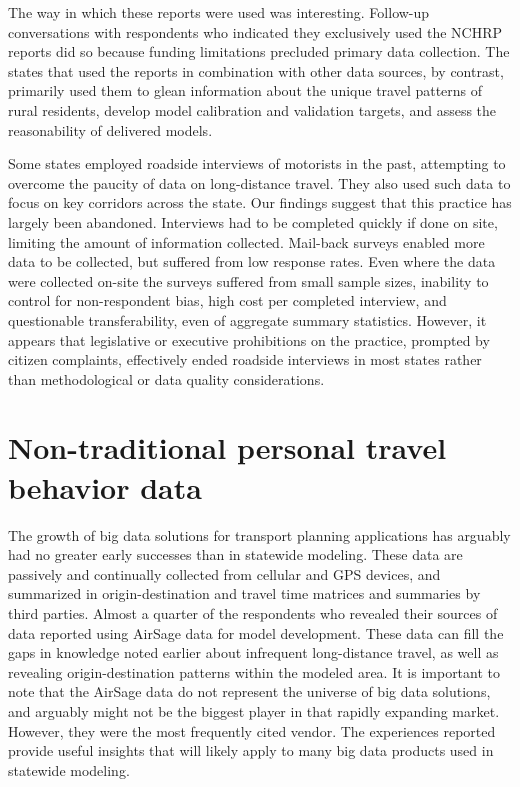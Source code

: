 The way in which these reports were used was interesting. Follow-up conversations with respondents who indicated they exclusively used the NCHRP reports did so because funding limitations precluded primary data collection. The states that used the reports in combination with other data sources, by contrast, primarily used them to glean information about the unique travel patterns of rural residents, develop model calibration and validation targets, and assess the reasonability of delivered models.

Some states employed roadside interviews of motorists in the past, attempting to overcome the paucity of data on long-distance travel. They also used such data to focus on key corridors across the state. Our findings suggest that this practice has largely been abandoned. Interviews had to be completed quickly if done on site, limiting the amount of information collected. Mail-back surveys enabled more data to be collected, but suffered from low response rates. Even where the data were collected on-site the surveys suffered from small sample sizes, inability to control for non-respondent bias, high cost per completed interview, and questionable transferability, even of aggregate summary statistics. However, it appears that legislative or executive prohibitions on the practice, prompted by citizen complaints, effectively ended roadside interviews in most states rather than methodological or data quality considerations.

\section{Non-traditional personal travel behavior data}\label{sec:nontraditional-person}

The growth of big data solutions for transport planning applications has arguably had no greater early successes than in statewide modeling. These data are passively and continually collected from cellular and GPS devices, and summarized in origin-destination and travel time matrices and summaries by third parties. Almost a quarter of the respondents who revealed their sources of data reported using AirSage data for model development. These data can fill the gaps in knowledge noted earlier about infrequent long-distance travel, as well as revealing origin-destination patterns within the modeled area. It is important to note that the AirSage data do not represent the universe of big data solutions, and arguably might not be the biggest player in that rapidly expanding market. However, they were the most frequently cited vendor. The experiences reported provide useful insights that will likely apply to many big data products used in statewide modeling.

